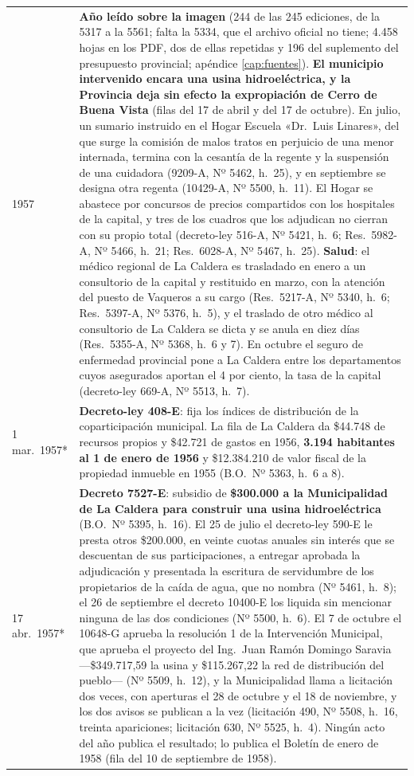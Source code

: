 \begin{longtable}{@{}p{2.7cm}p{10.3cm}@{}}
1957 & \textbf{Año leído sobre la imagen} (244 de las 245 ediciones, de la 5317 a la 5561; falta la 5334, que el archivo oficial no tiene; 4.458 hojas en los PDF, dos de ellas repetidas y 196 del suplemento del presupuesto provincial; apéndice \ref{cap:fuentes}). \textbf{El municipio intervenido encara una usina hidroeléctrica, y la Provincia deja sin efecto la expropiación de Cerro de Buena Vista} (filas del 17 de abril y del 17 de octubre). En julio, un sumario instruido en el Hogar Escuela «Dr.\ Luis Linares», del que surge la comisión de malos tratos en perjuicio de una menor internada, termina con la cesantía de la regente y la suspensión de una cuidadora (9209-A, Nº 5462, h.\ 25), y en septiembre se designa otra regenta (10429-A, Nº 5500, h.\ 11). El Hogar se abastece por concursos de precios compartidos con los hospitales de la capital, y tres de los cuadros que los adjudican no cierran con su propio total (decreto-ley 516-A, Nº 5421, h.\ 6; Res.\ 5982-A, Nº 5466, h.\ 21; Res.\ 6028-A, Nº 5467, h.\ 25). \textbf{Salud}: el médico regional de La Caldera es trasladado en enero a un consultorio de la capital y restituido en marzo, con la atención del puesto de Vaqueros a su cargo (Res.\ 5217-A, Nº 5340, h.\ 6; Res.\ 5397-A, Nº 5376, h.\ 5), y el traslado de otro médico al consultorio de La Caldera se dicta y se anula en diez días (Res.\ 5355-A, Nº 5368, h.\ 6 y 7). En octubre el seguro de enfermedad provincial pone a La Caldera entre los departamentos cuyos asegurados aportan el 4 por ciento, la tasa de la capital (decreto-ley 669-A, Nº 5513, h.\ 7). \\
1 mar.\ 1957* & \textbf{Decreto-ley 408-E}: fija los índices de distribución de la coparticipación municipal. La fila de La Caldera da \$44.748 de recursos propios y \$42.721 de gastos en 1956, \textbf{3.194 habitantes al 1 de enero de 1956} y \$12.384.210 de valor fiscal de la propiedad inmueble en 1955 (B.O.\ Nº 5363, h.\ 6 a 8). \\
17 abr.\ 1957* & \textbf{Decreto 7527-E}: subsidio de \textbf{\$300.000 a la Municipalidad de La Caldera para construir una usina hidroeléctrica} (B.O.\ Nº 5395, h.\ 16). El 25 de julio el decreto-ley 590-E le presta otros \$200.000, en veinte cuotas anuales sin interés que se descuentan de sus participaciones, a entregar aprobada la adjudicación y presentada la escritura de servidumbre de los propietarios de la caída de agua, que no nombra (Nº 5461, h.\ 8); el 26 de septiembre el decreto 10400-E los liquida sin mencionar ninguna de las dos condiciones (Nº 5500, h.\ 6). El 7 de octubre el 10648-G aprueba la resolución 1 de la Intervención Municipal, que aprueba el proyecto del Ing.\ Juan Ramón Domingo Saravia ---\$349.717,59 la usina y \$115.267,22 la red de distribución del pueblo--- (Nº 5509, h.\ 12), y la Municipalidad llama a licitación dos veces, con aperturas el 28 de octubre y el 18 de noviembre, y los dos avisos se publican a la vez (licitación 490, Nº 5508, h.\ 16, treinta apariciones; licitación 630, Nº 5525, h.\ 4). Ningún acto del año publica el resultado; lo publica el Boletín de enero de 1958 (fila del 10 de septiembre de 1958). \\

\end{longtable}

